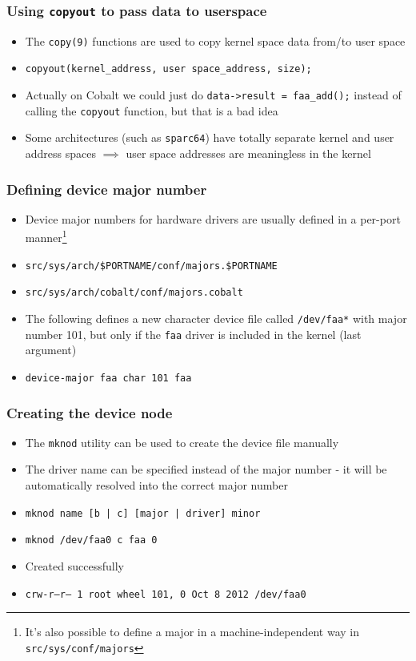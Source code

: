 \documentclass[dvipsnames,table]{beamer}
\begin{document}
\begin{frame}
\frametitle{Using {\tt copyout} to pass data to userspace}
\begin{itemize}
	\item The {\tt copy(9)} functions are used to copy kernel space data from/to user space
	\item {\tt copyout(kernel\_address, user space\_address, size);}
	\item Actually on Cobalt we could just do {\tt *data->result = faa\_add();} instead of calling the {\tt copyout} function, but that is a bad idea
	\item Some architectures (such as {\tt sparc64}) have totally separate kernel and user address spaces $ \implies $ user space addresses are meaningless in the kernel

\end{itemize}
\end{frame}

\begin{frame}
\frametitle{Defining device major number}
\begin{itemize}
	\item Device major numbers for hardware drivers are usually defined in a per-port manner\footnote{It's also possible to define a major in a machine-independent way in {\tt src/sys/conf/majors}}
	\item {\tt src/sys/arch/\$PORTNAME/conf/majors.\$PORTNAME}
	\item {\tt src/sys/arch/cobalt/conf/majors.cobalt}
	\item The following defines a new character device file called {\tt /dev/faa*} with major number 101, but only if the {\tt faa} driver is included in the kernel (last argument)
	\item {\tt device-major faa char 101 faa}
\end{itemize}
\end{frame}

\begin{frame}
\frametitle{Creating the device node}
\begin{itemize}
	\item The {\tt mknod} utility can be used to create the device file manually
	\item The driver name can be specified instead of the major number - it will be automatically resolved into the correct major number
	\item {\tt mknod name [b | c] [major | driver] minor}
	\item {\tt mknod /dev/faa0 c faa 0}
	\item Created successfully
	\scriptsize
	\item {\tt crw-r--r--  1 root  wheel  101, 0 Oct  8  2012 /dev/faa0}
	\normalsize
\end{itemize}
\end{frame}
\end{document}
